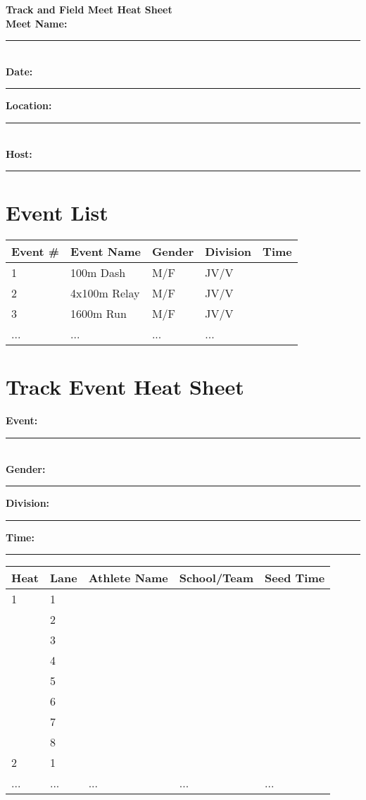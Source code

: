 \documentclass[11pt]{article}
\begin{document}
\begin{center}
    \LARGE \textbf{Track and Field Meet Heat Sheet} \\
    \vspace{0.5em}
    \large \textbf{Meet Name:} \rule{10cm}{0.4pt} \\
    \textbf{Date:} \rule{4cm}{0.4pt} \hspace{2cm} \textbf{Location:} \rule{6cm}{0.4pt} \\
    \textbf{Host:} \rule{10cm}{0.4pt}
\end{center}

\vspace{1em}

\section*{Event List}

\begin{tabular}{@{}lllll@{}}
\toprule
\textbf{Event \#} & \textbf{Event Name} & \textbf{Gender} & \textbf{Division} & \textbf{Time} \\
\midrule
1 & 100m Dash       & M/F & JV/V & \\
2 & 4x100m Relay    & M/F & JV/V & \\
3 & 1600m Run       & M/F & JV/V & \\
... & ...           & ... & ...  & \\
\bottomrule
\end{tabular}

\vspace{2em}

\section*{Track Event Heat Sheet}

\textbf{Event:} \rule{10cm}{0.4pt} \\
\textbf{Gender:} \rule{3cm}{0.4pt} \hspace{1cm} \textbf{Division:} \rule{3cm}{0.4pt} \hspace{1cm} \textbf{Time:} \rule{3cm}{0.4pt}

\vspace{1em}

\begin{tabular}{@{}lllll@{}}
\toprule
\textbf{Heat} & \textbf{Lane} & \textbf{Athlete Name} & \textbf{School/Team} & \textbf{Seed Time} \\
\midrule
1 & 1 & & & \\
  & 2 & & & \\
  & 3 & & & \\
  & 4 & & & \\
  & 5 & & & \\
  & 6 & & & \\
  & 7 & & & \\
  & 8 & & & \\
2 & 1 & & & \\
... & ... & ... & ... & ... \\
\bottomrule
\end{tabular}
\end{document}
